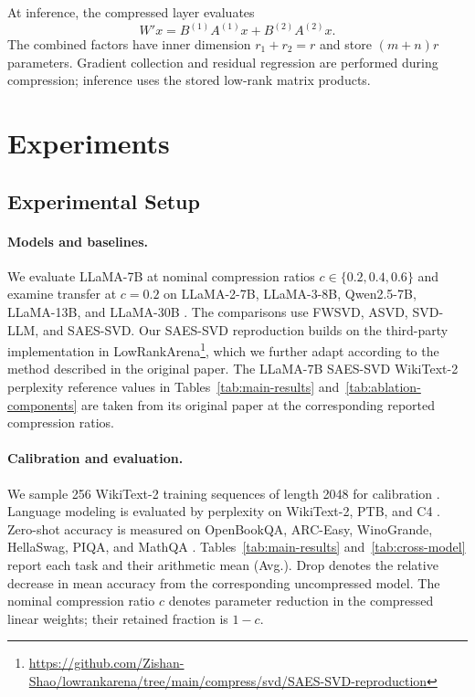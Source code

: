 \documentclass[11pt]{article}
\begin{document}
At inference, the compressed layer evaluates
\begin{equation}
W'x=B^{(1)}A^{(1)}x+B^{(2)}A^{(2)}x.
\label{eq:deployment}
\end{equation}
The combined factors have inner dimension $r_1+r_2=r$ and store $(m+n)r$ parameters. Gradient collection and residual regression are performed during compression; inference uses the stored low-rank matrix products.

\section{Experiments}\label{sec:experiments}



\subsection{Experimental Setup}

\paragraph{Models and baselines.}
We evaluate LLaMA-7B at nominal compression ratios $c\in\{0.2,0.4,0.6\}$ and examine transfer at $c=0.2$ on LLaMA-2-7B, LLaMA-3-8B, Qwen2.5-7B, LLaMA-13B, and LLaMA-30B \citep{touvron2023llama,touvron2023llama2,dubey2024llama3,yang2024qwen25}. The comparisons use FWSVD, ASVD, SVD-LLM, and SAES-SVD. Our SAES-SVD reproduction builds on the third-party implementation in LowRankArena\footnote{\url{https://github.com/Zishan-Shao/lowrankarena/tree/main/compress/svd/SAES-SVD-reproduction}}, which we further adapt according to the method described in the original paper. The LLaMA-7B SAES-SVD WikiText-2 perplexity reference values in Tables~\ref{tab:main-results} and~\ref{tab:ablation-components} are taken from its original paper at the corresponding reported compression ratios.

\paragraph{Calibration and evaluation.}
We sample 256 WikiText-2 training sequences of length 2048 for calibration \citep{merity2017wikitext2}. Language modeling is evaluated by perplexity on WikiText-2, PTB, and C4 \citep{marcus1993ptb,raffel2020c4}. Zero-shot accuracy is measured on OpenBookQA, ARC-Easy, WinoGrande, HellaSwag, PIQA, and MathQA \citep{mihaylov2018openbook,clark2018think,sakaguchi2021winogrande,zellers2019hellaswag,bisk2020piqa,amini2019mathqa}. Tables~\ref{tab:main-results} and~\ref{tab:cross-model} report each task and their arithmetic mean (Avg.). Drop denotes the relative decrease in mean accuracy from the corresponding uncompressed model. The nominal compression ratio $c$ denotes parameter reduction in the compressed linear weights; their retained fraction is $1-c$.
\end{document}
